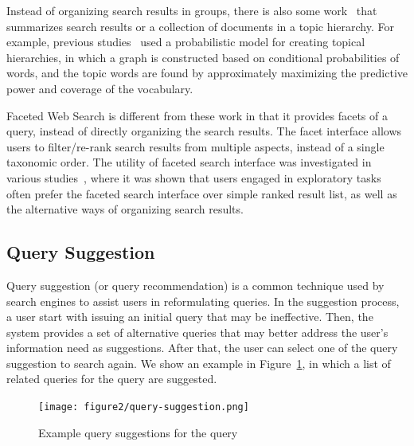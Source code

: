 
Instead of organizing search results in groups, there is also some work~\cite{lawrie2001finding,lawrie2003generating, nevill1999lexically} that summarizes search results or a collection of documents in a topic hierarchy. For example, previous studies~\cite{lawrie2001finding,lawrie2003generating} used a probabilistic model for creating topical hierarchies, in which a graph is constructed based on conditional probabilities of words, and the topic words are found by approximately maximizing the predictive power and coverage of the vocabulary.


Faceted Web Search is different from these work in that it provides facets of a query, instead of directly organizing the search results. The facet interface allows users to filter/re-rank search results from multiple aspects, instead of a single taxonomic order. The utility of faceted search interface was investigated in various studies~\cite{pollitt1998key,hearst2006clustering,pratt1999knowledge,yee2003faceted,kaki2005findex,rodden2001does}, where it was shown that users engaged in exploratory tasks often prefer the faceted search interface over simple ranked result list, as well as the alternative ways of organizing search results.

\subsection{Query Suggestion}
Query suggestion (or query recommendation) is a common technique used by search engines to assist users in reformulating queries. In the suggestion process, a user start with issuing an initial query that may be ineffective. Then, the system provides a set of alternative queries that may better address the user's information need as suggestions. After that, the user can select one of the query suggestion to search again. We show an example in Figure~\ref{fig:bg-qsuggestion}, in which a list of related queries for the query  are suggested.  

\vspace{+5mm}
\begin{figure}[!ht]
\centering
\texttt{[image: figure2/query-suggestion.png]}
\caption{Example query suggestions for the query }
\label{fig:bg-qsuggestion}
\end{figure}

